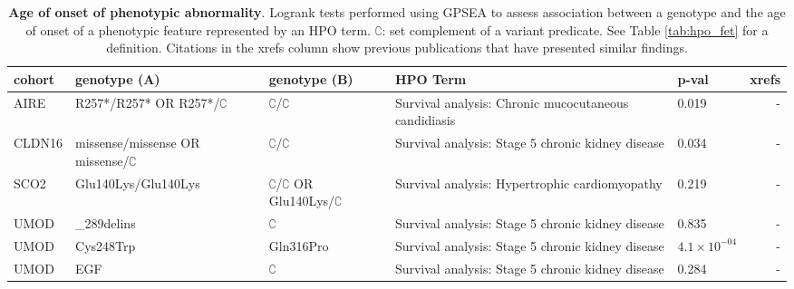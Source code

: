 \begin{table}
\centering
\begin{tabular}{l>{\raggedright\arraybackslash}p{3.5cm}>{\raggedright\arraybackslash}p{2.5cm}>{\raggedright\arraybackslash}p{4cm}lr}
\toprule
\textbf{cohort} & \textbf{genotype (A)} & \textbf{genotype (B)} & \textbf{HPO Term} & \textbf{p-val} & \textbf{xrefs}\\
\midrule
AIRE & R257*/R257* OR R257*/$\complement$ & $\complement$/$\complement$ & Survival analysis: Chronic mucocutaneous candidiasis & 0.019 & -\\
CLDN16 & missense/missense OR missense/$\complement$ & $\complement$/$\complement$ & Survival analysis: Stage 5 chronic kidney disease & 0.034 & -\\
SCO2 & Glu140Lys/Glu140Lys & $\complement$/$\complement$ OR Glu140Lys/$\complement$ & Survival analysis: Hypertrophic cardiomyopathy & 0.219 & -\\
UMOD & 278\_289delins & $\complement$ & Survival analysis: Stage 5 chronic kidney disease & 0.835 & -\\
UMOD & Cys248Trp & Gln316Pro & Survival analysis: Stage 5 chronic kidney disease & $4.1 \times 10^{-04}$ & -\\
UMOD & EGF & $\complement$ & Survival analysis: Stage 5 chronic kidney disease & 0.284 & -\\
\bottomrule
\end{tabular}
\caption{\textbf{Age of onset of phenotypic abnormality}. Logrank tests performed using GPSEA to assess association between a genotype and the 
age of onset of a phenotypic feature represented by an HPO term. $\complement$: set complement of a variant predicate. See Table \ref{tab:hpo_fet} for a definition. Citations in the xrefs column show previous publications that have presented similar findings.}
\label{tab:hpo_onset}
\end{table}
\clearpage
\newpage



